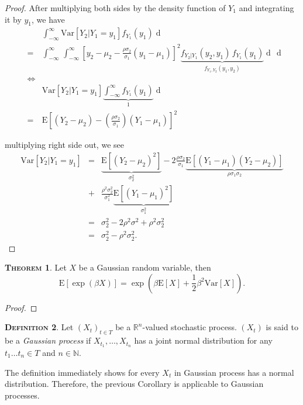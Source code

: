 \documentclass[a4paper, twoside, 11pt]{article}
\theoremstyle{definition}
\newtheorem{definition}{\scshape Definition}[section]
\newtheorem{theorem}[definition]{\scshape Theorem}
\newcommand{\sqbr}[1]{\left[ {#1} \right]}
\begin{document}
\begin{proof}
 After multiplying both sides by the density function of $Y_1$ and integrating it by $y_1$, we have
\begin{eqnarray*}
 &\,&\int_{-\infty}^{\infty} \mathrm{Var}[Y_2|Y_1=y_1] f_{Y_1}(y_1) \mathop{dy_1} \\
 &=&\int_{-\infty}^{\infty}\,\int_{-\infty}^{\infty} \sqbr{y_2 - \mu_2 
	- \frac{\rho\sigma_2}{\sigma_1}(y_1-\mu_1)}^2\underbrace{f_{Y_2|Y_1}(y_2, y_1)\,f_{Y_1}(y_1)}_{f_{Y_1, Y_2}(y_1, y_2)} \mathop{dy_2}\,\mathop{dy_1}\\
	&\iff&\\
	&\,&\mathrm{Var}[Y_2|Y_1=y_1] \underbrace{\int_{-\infty}^{\infty}  f_{Y_1}(y_1)}_{1} \mathop{dy_1} \\
	&=& \mathrm{E}\sqbr{(Y_2 - \mu_2) - (\frac{\rho\sigma_2}{\sigma_1})(Y_1 - \mu_1)}^2 
\end{eqnarray*}

multiplying right side out, we see
\begin{eqnarray*}
  \mathrm{Var}[Y_2|Y_1=y_1] &=&\underbrace{\mathrm{E}[(Y_2 - \mu_2)^2]}_{\sigma_2^2} - 2\frac{\rho\sigma_2}{\sigma_1}\underbrace{\mathrm{E}[(Y_1 -\mu_1)(Y_2 - \mu_2)]}_{\rho\sigma_1\sigma_2}\\
  &+& \frac{\rho^2\sigma_2^2}{\sigma_1^2}\underbrace{\mathrm{E}[(Y_1-\mu_1)^2]}_{\sigma_1^2}\\
  &=& \sigma_2^2 - 2\rho^2\sigma^2 + \rho^2\sigma_2^2\\
  &=& \sigma_2^2 - \rho^2\sigma_2^2.
\end{eqnarray*} 
\end{proof}

\begin{theorem}
  Let $X$ be a Gaussian random variable, then
  \begin{equation}
	\mathrm{E}[\exp(\beta X)] = \exp(\beta\mathrm{E}[X] + \frac{1}{2}\beta^2\mathrm{Var}[X]).
	\label{sec:expgau}
  \end{equation}
\end{theorem}

\begin{proof}
  
\end{proof}

\begin{definition}
  Let $(X_t)_{t \in T}$ be a $\mathbb{R}^{n}$-valued stochastic process. $(X_t)$ is said to be a \emph{Gaussian process} if $X_{t_1},\dots, X_{t_n}$ has a joint normal distribution for any  $t_1 \dots t_n \in T$ and $n \in \mathbb{N}$. 
\end{definition}
The definition immediately shows for every $X_t$ in Gaussian process has a normal distribution. Therefore, the previous Corollary is applicable to  Gaussian processes.
\end{document}
